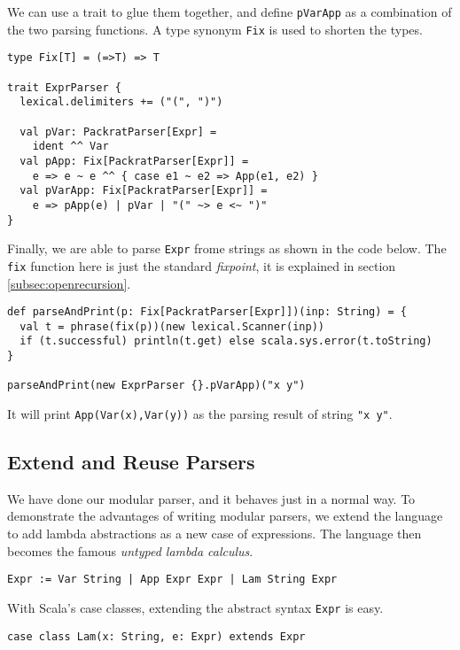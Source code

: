 We can use a trait to glue them together, and define \lstinline{pVarApp} as a combination of the two parsing functions. A type synonym \lstinline{Fix} is used to shorten the types.

\begin{lstlisting}
type Fix[T] = (=>T) => T

trait ExprParser {
  lexical.delimiters += ("(", ")")

  val pVar: PackratParser[Expr] =
    ident ^^ Var
  val pApp: Fix[PackratParser[Expr]] =
    e => e ~ e ^^ { case e1 ~ e2 => App(e1, e2) }
  val pVarApp: Fix[PackratParser[Expr]] =
    e => pApp(e) | pVar | "(" ~> e <~ ")"
}
\end{lstlisting}

Finally, we are able to parse \lstinline{Expr} frome strings as shown in the code below. The \lstinline{fix} function here is just the standard \textit{fixpoint}, it is explained in section \ref{subsec:openrecursion}.

\begin{lstlisting}
def parseAndPrint(p: Fix[PackratParser[Expr]])(inp: String) = {
  val t = phrase(fix(p))(new lexical.Scanner(inp))
  if (t.successful) println(t.get) else scala.sys.error(t.toString)
}

parseAndPrint(new ExprParser {}.pVarApp)("x y")
\end{lstlisting}

It will print \lstinline{App(Var(x),Var(y))} as the parsing result of string \lstinline{"x y"}.

\subsection{Extend and Reuse Parsers}\label{subsec:overview-extend}

We have done our modular parser, and it behaves just in a normal way. To demonstrate the advantages of writing modular parsers, we extend the language to add lambda abstractions as a new case of expressions. The language then becomes the famous \textit{untyped lambda calculus}.

\begin{lstlisting}[language=PlainCode]
Expr := Var String | App Expr Expr | Lam String Expr
\end{lstlisting}

With Scala's case classes, extending the abstract syntax \lstinline{Expr} is easy.

\begin{lstlisting}
case class Lam(x: String, e: Expr) extends Expr
\end{lstlisting}


